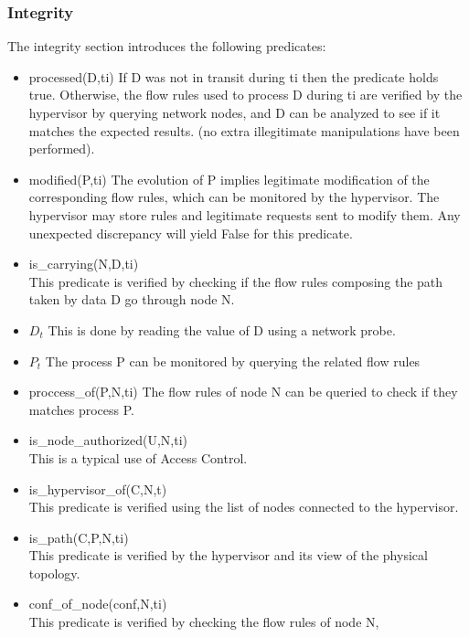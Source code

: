 \subsubsection{Integrity}
The integrity section introduces the following predicates:
\begin{itemize}

\item processed(D,ti)
\newline
If D was not in transit during ti then the predicate holds true.
Otherwise, the flow rules used to process D during ti are verified by the hypervisor by querying network nodes, and D can be analyzed to see if it matches the expected results. (\ie no extra illegitimate manipulations have been performed).

\item modified(P,ti)
\newline
The evolution of P implies legitimate modification of the corresponding flow rules, which can be monitored by the hypervisor. The hypervisor may store rules and legitimate requests sent to modify them. Any unexpected discrepancy will yield False for this predicate.

\item is\_carrying(N,D,ti)\\
This predicate is verified by checking if the flow rules composing the path taken by data D go through node N.


\item $D_{t}$
\newline
This is done by reading the value of D using a network probe.

\item $P_t$
\newline
The process P can be monitored by querying the related flow rules

\item proccess\_of(P,N,ti)
\newline
The flow rules of node N can be queried to check if they matches process P.

\item is\_node\_authorized(U,N,ti)\\
This is a typical use of Access Control.

\item is\_hypervisor\_of(C,N,t)\\
This predicate is verified using the list of nodes connected to the hypervisor.

\item is\_path(C,P,N,ti)\\
This predicate  is verified by the hypervisor and its view of the physical topology.

\item conf\_of\_node(conf,N,ti)\\
This predicate  is verified by checking the flow rules of node N,

\end{itemize}

